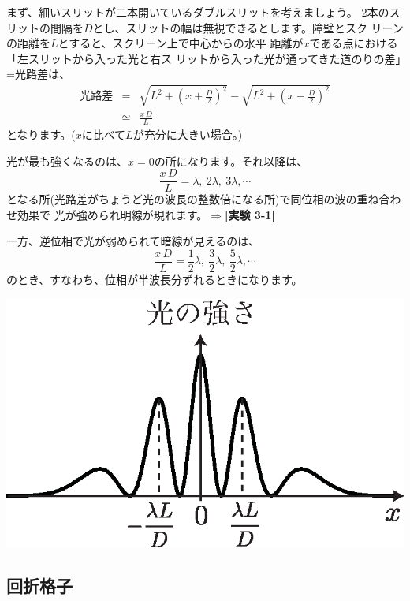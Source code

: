 まず、細いスリットが二本開いているダブルスリットを考えましょう。
2本のスリットの間隔を$D$とし、スリットの幅は無視できるとします。障壁とスク
リーンの距離を$L$とすると、スクリーン上で中心からの水平
距離が$x$である点における「左スリットから入った光と右ス
リットから入った光が通ってきた道のりの差」=光路差は、
\begin{eqnarray}
光路差&=&\sqrt{L^2+\left(x+\frac{D}{2}\right)^2}
-\sqrt{L^2+\left(x-\frac{D}{2}\right)^2}\nonumber\\
&\simeq& \frac{x\,D}{L}\nonumber
\end{eqnarray}
となります。($x$に比べて$L$が充分に大きい場合。)

光が最も強くなるのは、$x=0$の所になります。それ以降は、
\[
\frac{x\,D}{L}=\lambda,~2\lambda,~3\lambda,\cdots
\]
となる所(光路差がちょうど光の波長の整数倍になる所)で同位相の波の重ね合わせ効果で
光が強められ明線が現れます。$\Rightarrow${\bf [実験 3-1]}

一方、逆位相で光が弱められて暗線が見えるのは、
\[
\frac{x\,D}{L}=\frac{1}{2}\lambda,~\frac{3}{2}\lambda,~\frac{5}{2}\lambda,\cdots
\]
のとき、すなわち、位相が半波長分ずれるときになります。 

\begin{center}
\includegraphics[scale=0.7]{03_Interference/two-slits-int.eps}
\end{center}


\subsection{回折格子}

